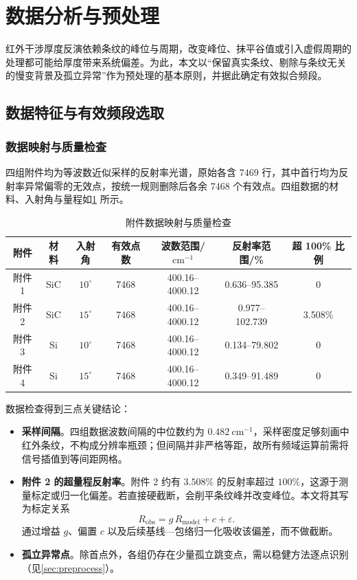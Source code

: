 \documentclass[withoutpreface,bwprint]{cumcmthesis}
\begin{document}
\section{数据分析与预处理}
红外干涉厚度反演依赖条纹的峰位与周期，改变峰位、抹平谷值或引入虚假周期的处理都可能给厚度带来系统偏差。为此，本文以“保留真实条纹、剔除与条纹无关的慢变背景及孤立异常”作为预处理的基本原则，并据此确定有效拟合频段。

\subsection{数据特征与有效频段选取}

\subsubsection{数据映射与质量检查}
四组附件均为等波数近似采样的反射率光谱，原始各含 $7469$ 行，其中首行均为反射率异常偏零的无效点，按统一规则删除后各余 $7468$ 个有效点。四组数据的材料、入射角与量程如\cref{tab:data_map} 所示。

\begin{table}[!htbp]
	\centering
	\caption{附件数据映射与质量检查}\label{tab:data_map}
	\begin{tabular}{ccccccc}
		\toprule
		附件 & 材料 & 入射角 & 有效点数 & 波数范围/$\mathrm{cm^{-1}}$ & 反射率范围/\% & 超 100\% 比例 \\
		\midrule
		附件 1 & SiC & $10^\circ$ & 7468 & 400.16--4000.12 & 0.636--95.385 & 0 \\
		附件 2 & SiC & $15^\circ$ & 7468 & 400.16--4000.12 & 0.977--102.739 & 3.508\% \\
		附件 3 & Si  & $10^\circ$ & 7468 & 400.16--4000.12 & 0.134--79.802 & 0 \\
		附件 4 & Si  & $15^\circ$ & 7468 & 400.16--4000.12 & 0.349--91.489 & 0 \\
		\bottomrule
	\end{tabular}
\end{table}

数据检查得到三点关键结论：

\begin{itemize}
	\item[(1)] \textbf{采样间隔}。四组数据波数间隔的中位数约为 $0.482\ \mathrm{cm^{-1}}$，采样密度足够刻画中红外条纹，不构成分辨率瓶颈；但间隔并非严格等距，故所有频域运算前需将信号插值到等间距网格。
	\item[(2)] \textbf{附件 2 的超量程反射率}。附件 2 约有 $3.508\%$ 的反射率超过 $100\%$，这源于测量标定或归一化偏差。若直接硬截断，会削平条纹峰并改变峰位。本文将其写为标定关系
	\begin{equation}
		R_{\mathrm{obs}}=g\,R_{\mathrm{model}}+c+\varepsilon.
		\label{eq:calib}
	\end{equation}
	通过增益 $g$、偏置 $c$ 以及后续基线—包络归一化吸收该偏差，而不做截断。
	\item[(3)] \textbf{孤立异常点}。除首点外，各组仍存在少量孤立跳变点，需以稳健方法逐点识别（见\cref{sec:preprocess}）。
\end{itemize}
\end{document}
